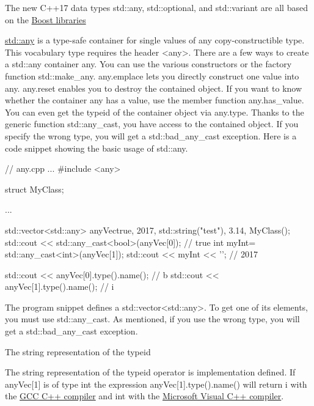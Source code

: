 The new C++17 data types std::any, std::optional, and std::variant are all based on the \href{http://www.boost.org/}{Boost libraries}


\href{http://en.cppreference.com/w/cpp/utility/any}{std::any} is a type-safe container for single values of any copy-constructible type. This vocabulary type requires the header <any>. There are a few ways to create a std::any container any. You can use the various constructors or the factory function std::make\_any. any.emplace lets you directly construct one value into any. any.reset enables you to destroy the contained object. If you want to know whether the container any has a value, use the member function any.has\_value. You can even get the typeid of the container object via any.type. Thanks to the generic function std::any\_cast, you have access to the contained object. If you specify the wrong type, you will get a std::bad\_any\_cast exception. Here is a code snippet showing the basic usage of std::any.


\begin{cpp}
// any.cpp
...
#include <any>

struct MyClass{};

...

std::vector<std::any> anyVec{true, 2017, std::string("test"), 3.14, MyClass()};
std::cout << std::any_cast<bool>(anyVec[0]); // true
int myInt= std::any_cast<int>(anyVec[1]);
std::cout << myInt << '\n'; // 2017

std::cout << anyVec[0].type().name(); // b
std::cout << anyVec[1].type().name(); // i
\end{cpp}

The program snippet defines a std::vector<std::any>. To get one of its elements, you must use std::any\_cast. As mentioned, if you use the wrong type, you will get a std::bad\_any\_cast exception.

\begin{myNotic}{The string representation of the typeid}
	
The string representation of the typeid operator is implementation defined. If anyVec[1] is of type int the expression anyVec[1].type().name() will return i with the \href{https://gcc.gnu.org/}{GCC C++ compiler} and int with the \href{https://en.wikipedia.org/wiki/Microsoft_Visual_C%2B%2B}{Microsoft Visual C++ compiler}.

\end{myNotic}

